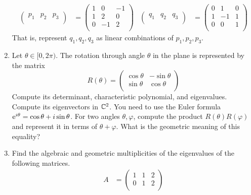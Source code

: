 \documentclass[../psets.tex]{subfiles}
\begin{document}
\begin{enumerate}
    \begin{align*}
        \begin{pmatrix}
            p_1 & p_2 & p_3\\
        \end{pmatrix}
        &=
        \begin{pmatrix}
            1 & 0 & -1\\
            1 & 2 & 0\\
            0 & -1 & 2\\
        \end{pmatrix}&
        \begin{pmatrix}
            q_1 & q_2 & q_3\\
        \end{pmatrix}
        &=
        \begin{pmatrix}
            0 & 1 & 0\\
            1 & -1 & 1\\
            0 & 0 & 1\\
        \end{pmatrix}
    \end{align*}
    That is, represent $q_1,q_2,q_3$ as linear combinations of $p_1,p_2,p_3$.
    \item Let $\theta\in[0,2\pi)$. The rotation through angle $\theta$ in the plane is represented by the matrix
    \begin{equation*}
        R(\theta) =
        \begin{pmatrix}
            \cos\theta & -\sin\theta\\
            \sin\theta & \cos\theta\\
        \end{pmatrix}
    \end{equation*}
    Compute its determinant, characteristic polynomial, and eigenvalues. Compute its eigenvectors in $\C^2$. You need to use the Euler formula $\e[i\theta]=\cos\theta+i\sin\theta$. For two angles $\theta,\varphi$, compute the product $R(\theta)R(\varphi)$ and represent it in terms of $\theta+\varphi$. What is the geometric meaning of this equality?
    \item Find the algebraic and geometric multiplicities of the eigenvalues of the following matrices.
    \begin{align*}
        A &=
        \begin{pmatrix}
            1 & 1 & 2\\
            0 & 1 & 2\\

\end{pmatrix}
\end{align*}
\end{enumerate}
\end{document}
